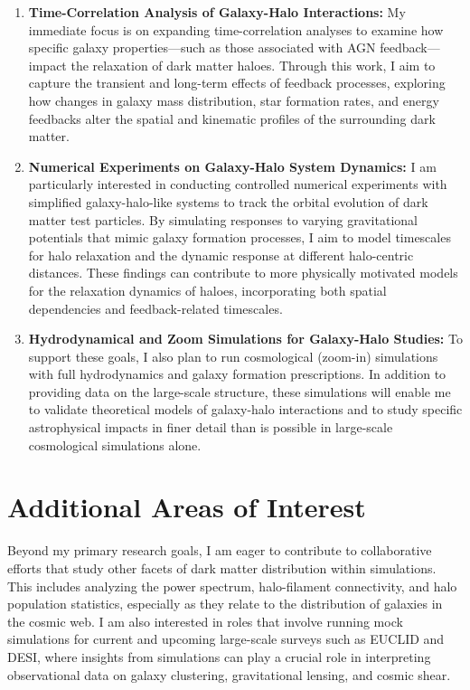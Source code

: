 \documentclass[12pt]{article}
\begin{document}
\begin{enumerate}[label=\arabic*.]
    \item \textbf{Time-Correlation Analysis of Galaxy-Halo Interactions:} My immediate focus is on expanding time-correlation analyses to examine how specific galaxy properties—such as those associated with AGN feedback—impact the relaxation of dark matter haloes. Through this work, I aim to capture the transient and long-term effects of feedback processes, exploring how changes in galaxy mass distribution, star formation rates, and energy feedbacks alter the spatial and kinematic profiles of the surrounding dark matter.

    \item \textbf{Numerical Experiments on Galaxy-Halo System Dynamics:} I am particularly interested in conducting controlled numerical experiments with simplified galaxy-halo-like systems to track the orbital evolution of dark matter test particles. By simulating responses to varying gravitational potentials that mimic galaxy formation processes, I aim to model timescales for halo relaxation and the dynamic response at different halo-centric distances. These findings can contribute to more physically motivated models for the relaxation dynamics of haloes, incorporating both spatial dependencies and feedback-related timescales.

    \item \textbf{Hydrodynamical and Zoom Simulations for Galaxy-Halo Studies:} To support these goals, I also plan to run cosmological (zoom-in) simulations with full hydrodynamics and galaxy formation prescriptions. In addition to providing data on the large-scale structure, these simulations will enable me to validate theoretical models of galaxy-halo interactions and to study specific astrophysical impacts in finer detail than is possible in large-scale cosmological simulations alone.
\end{enumerate}

\section*{Additional Areas of Interest}
Beyond my primary research goals, I am eager to contribute to collaborative efforts that study other facets of dark matter distribution within simulations. This includes analyzing the power spectrum, halo-filament connectivity, and halo population statistics, especially as they relate to the distribution of galaxies in the cosmic web. I am also interested in roles that involve running mock simulations for current and upcoming large-scale surveys such as EUCLID and DESI, where insights from simulations can play a crucial role in interpreting observational data on galaxy clustering, gravitational lensing, and cosmic shear.
\end{document}

